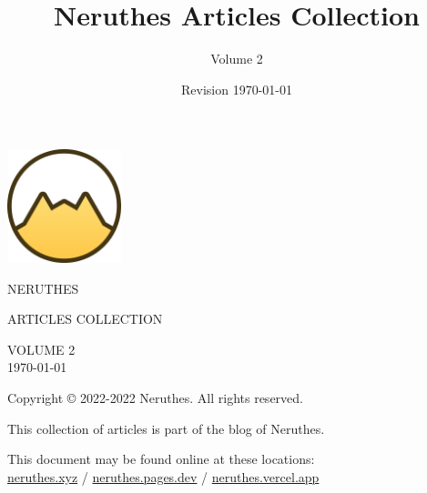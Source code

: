 \documentclass[12pt,a4paper]{report}
\title{Neruthes Articles Collection}
\author{Volume 2}
\date{Revision \today}
\begin{document}
\begin{titlepage}
	\center
    \ttfamily
	\includegraphics[width=33mm]{wwwsrc/neruthes-forceCircle-unpadded.png}\par
	\vskip 110pt
    {\fontsize{30pt}{30pt}\selectfont\MakeUppercase{Neruthes}}\par\vskip 30pt
    {\LARGE\MakeUppercase{Articles Collection}}\par
	\vfill
	\normalsize
    \MakeUppercase{
	Volume 2\\
	\today}\par
\end{titlepage}
\pagestyle{plain}
\tableofcontents\clearpage





\rmfamily








\clearpage\pagestyle{empty}
\leavevmode\vfill
\small\sffamily
Copyright \copyright{} 2022-2022 Neruthes. All rights reserved.\par
This collection of articles is part of the blog of Neruthes.\par
This document may be found online at these locations:\\
\href{https://neruthes.xyz/articles/Neruthes_articles_vol002.pdf}{neruthes.xyz} /
\href{https://neruthes.pages.dev/articles/Neruthes_articles_vol002.pdf}{neruthes.pages.dev} /
\href{https://neruthes.vercel.app/articles/Neruthes_articles_vol002.pdf}{neruthes.vercel.app}
\end{document}
